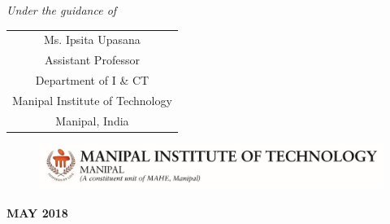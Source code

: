 \documentclass[runningheads,a4paper,12pt]{report}
\renewcommand{\baselinestretch}{1.66}
\begin{document}
\begin{titlepage}
	\begin{center}
	\small{\textit{Under the guidance of}} \\
\renewcommand{\baselinestretch}{1}
\begin{table}[h]
	\centering
		\begin{tabular}{ c }
            Ms. Ipsita Upasana \\
    		Assistant Professor \\
    		Department of I \& CT \\
    		 Manipal Institute of Technology \\
    		Manipal, India
		\end{tabular}
\end{table}
	\end{center}
	\begin{figure}[h]
  \begin{center}
	\includegraphics[scale=1]{MITLogo}
	\end{center}
	\end{figure}
	\begin{center}
	\textbf{MAY 2018}
	\end{center}
\end{titlepage}

\setcounter{secnumdepth}{3}
\setcounter{tocdepth}{3}






\tableofcontents
\listoftables
{}
\listoffigures
{}








\addappheadtotoc
\appendixpage



\renewcommand{\bibname}{References} %

\rhead{}

\end{document}

